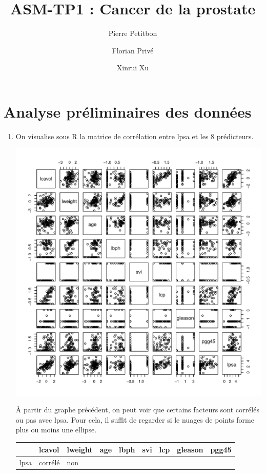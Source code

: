 \documentclass[a4paper, 12pt]{article}
\title{ASM-TP1 : Cancer de la prostate}
\author{Pierre Petitbon \and Florian Privé \and Xinrui Xu}
\date{}
\begin{document}
\maketitle

\section{Analyse préliminaires des données}

\begin{enumerate}

\item On visualise sous R la matrice de corrélation entre lpsa et les 8 prédicteurs. 

\begin{center}
\includegraphics[scale=0.5]{Rplots.pdf}
\label{fig1}
\end{center}

À partir du graphe précédent, on peut voir que certains facteurs sont corrélés ou pas avec lpsa. Pour cela, il suffit de regarder si le nuages de points forme plus ou moins une ellipse. 

\begin{tabular}{|p{0.5cm}|p{1.5cm}|p{1.5cm}|p{1.5cm}|p{1.5cm}|p{1.5cm}|p{1.5cm}|p{1.5cm}|p{1.5cm}|}
  \hline
       & lcavol & lweight & age & lbph & svi & lcp & gleason & pgg45 \\
  \hline
  lpsa & corrélé & non 


\end{tabular}
\end{enumerate}
\end{document}
